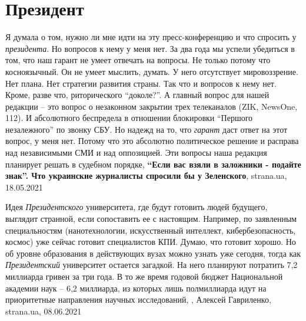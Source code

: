  
 
 
 
 
\chapter{Президент}

Я думала о том, нужно ли мне идти на эту пресс-конференцию и что спросить у
\emph{президента}. Но вопросов к нему у меня нет. За два года мы успели убедиться в
том, что наш гарант не умеет отвечать на вопросы. Не только потому что
косноязычный. Он не умеет мыслить, думать. У него отсутствует мировоззрение.
Нет плана. Нет стратегии развития страны. Так что и вопросов к нему нет. Кроме,
разве что, риторического \enquote{доколе?}.  А главный вопрос для нашей
редакции – это вопрос о незаконном закрытии трех телеканалов (ZIK, NewsOne,
112). И абсолютного беспредела в отношении блокировки \enquote{Першого
незалежного} по звонку СБУ. Но надежд на то, что \emph{гарант} даст ответ на этот
вопрос, у меня нет. Потому что это абсолютно политическое решение и расправа
над независимыми СМИ и над оппозицией. Эти вопросы наша редакция планирует
решать в судебном порядке,
\textbf{\enquote{Если вас взяли в заложники - подайте знак}. Что украинские журналисты спросили бы у Зеленского},
strana.ua, 18.05.2021

Идея \emph{Президентского} университета, где будут готовить людей будущего,
выглядит странной, если сопоставить ее с настоящим. Например, по заявленным
специальностям (нанотехнологии, искусственный интеллект, кибербезопасность,
космос) уже сейчас готовит специалистов КПИ. Думаю, что готовит хорошо. Но об
уровне образования в действующих вузах можно узнать уже сегодня, тогда как
\emph{Президентский} университет остается загадкой.  На него планируют
потратить 7,2 миллиарда гривен за три года. В то же время годовой бюджет
Национальной академии наук – 6,2 миллиарда, из которых лишь полмиллиарда идут
на приоритетные направления научных исследований,
, Алексей Гавриленко, strana.ua, 08.06.2021

